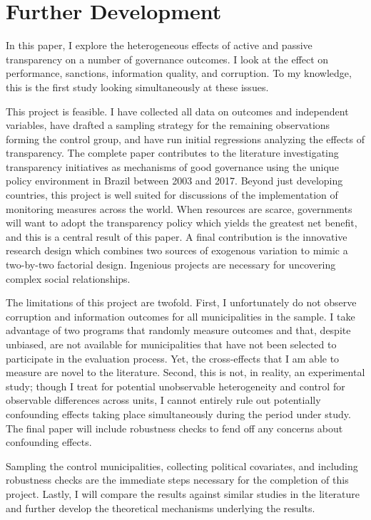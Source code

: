 \documentclass[11pt]{article}
\begin{document}
\section{Further Development} \label{sec:conclusion_paper3}

In this paper, I explore the heterogeneous effects of active and passive transparency on a number of governance outcomes. I look at the effect on performance, sanctions, information quality, and corruption. To my knowledge, this is the first study looking simultaneously at these issues.

This project is feasible. I have collected all data on outcomes and independent variables, have drafted a sampling strategy for the remaining observations forming the control group, and have run initial regressions analyzing the effects of transparency. The complete paper contributes to the literature investigating transparency initiatives as mechanisms of good governance using the unique policy environment in Brazil between 2003 and 2017. Beyond just developing countries, this project is well suited for discussions of the implementation of monitoring measures across the world. When resources are scarce, governments will want to adopt the transparency policy which yields the greatest net benefit, and this is a central result of this paper. A final contribution is the innovative research design which combines two sources of exogenous variation to mimic a two-by-two factorial design. Ingenious projects are necessary for uncovering complex social relationships.

The limitations of this project are twofold. First, I unfortunately do not observe corruption and information outcomes for all municipalities in the sample. I take advantage of two programs that randomly measure outcomes and that, despite unbiased, are not available for municipalities that have not been selected to participate in the evaluation process. Yet, the cross-effects that I am able to measure are novel to the literature. Second, this is not, in reality, an experimental study; though I treat for potential unobservable heterogeneity and control for observable differences across units, I cannot entirely rule out potentially confounding effects taking place simultaneously during the period under study. The final paper will include robustness checks to fend off any concerns about confounding effects.

Sampling the control municipalities, collecting political covariates, and including robustness checks are the immediate steps necessary for the completion of this project. Lastly, I will compare the results against similar studies in the literature and further develop the theoretical mechanisms underlying the results.

\clearpage

\setlength\bibsep{0pt}


\end{document}
